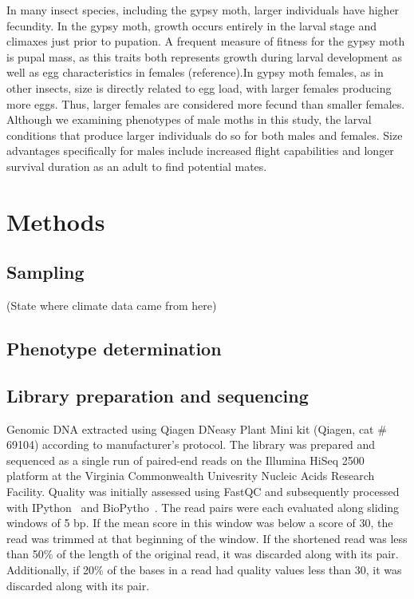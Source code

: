 \documentclass[fleqn,11pt]{wlpeerj}
\begin{document}
In many insect species, including the gypsy moth, larger individuals have higher fecundity. In the gypsy moth, growth occurs entirely in the larval stage and climaxes just prior to pupation. A frequent measure of fitness for the gypsy moth is pupal mass, as this traits both represents growth during larval development as well as egg characteristics in females (reference).In gypsy moth females, as in other insects, size is directly related to egg load, with larger females producing more eggs. Thus, larger females are considered more fecund than smaller females. Although we examining phenotypes of male moths in this study, the larval conditions that produce larger individuals do so for both males and females. Size advantages specifically for males include increased flight capabilities and longer survival duration as an adult to find potential mates.


\section*{Methods}

\subsection*{Sampling}

(State where climate data came from here)

\subsection*{Phenotype determination}

\subsection*{Library preparation and sequencing}

Genomic DNA extracted using Qiagen DNeasy Plant Mini kit (Qiagen, cat \# 69104)
according to manufacturer's protocol.  The library was prepared and sequenced as
a single run of paired-end reads on the Illumina HiSeq 2500 platform at the
Virginia Commonwealth Univesrity Nucleic Acids Research Facility. Quality was
initially assessed using FastQC \citep{fastqc} and subsequently processed with
IPython~\citep{Perez:2007hy} and BioPytho~\citep{Cock:2009hj}. The read pairs
were each evaluated along sliding windows of 5 bp.  If the mean score in this
window was below a score of 30, the read was trimmed at that beginning of the
window. If the shortened read was less than 50\% of the length of the original
read, it was discarded along with its pair. Additionally, if 20\% of the bases
in a read had quality values less than 30, it was discarded along with its pair.
\end{document}

